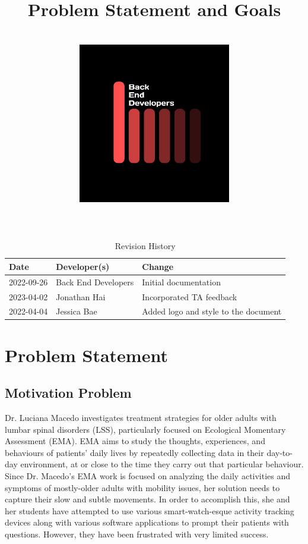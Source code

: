 \documentclass[12pt]{article}
\title{\textbf{Problem Statement and Goals\\\progname \\ \vspace{2cm} \includegraphics[width=0.5\textwidth]{../logo.jpg}}}
\author{\authname}
\date{}
\begin{document}
\color{white}\maketitle
\color{black}
\newpage
\begin{table}[hp]
    \caption{Revision History} \label{TblRevisionHistory}
    \begin{tabularx}{\textwidth}{llX}
        \toprule
        \textbf{Date}  & \textbf{Developer(s)} & \textbf{Change}       \\
        \midrule
        2022-09-26 &    Back End Developers   & Initial documentation \\
        2023-04-02 &    Jonathan Hai & Incorporated TA feedback \\
        2022-04-04 &    Jessica Bae & Added logo and style to the document \\
        \bottomrule
    \end{tabularx}
\end{table}

\newpage

\section{Problem Statement}

\subsection{Motivation Problem}

Dr. Luciana Macedo investigates treatment strategies for older adults with  lumbar spinal disorders (LSS), particularly focused on Ecological Momentary Assessment (EMA). EMA aims to study the thoughts, experiences, and behaviours of patients' daily lives by repeatedly collecting data in their day-to-day environment, at or close to the time they carry out that particular behaviour.\\

Since Dr. Macedo's EMA work is focused on analyzing the daily activities and symptoms of mostly-older adults with mobility issues, her solution needs to capture their slow and subtle movements. In order to accomplish this, she and her students have attempted to use various smart-watch-esque activity tracking devices along with various software applications to prompt their patients with questions. However, they have been frustrated with very limited success.\\
\end{document}
